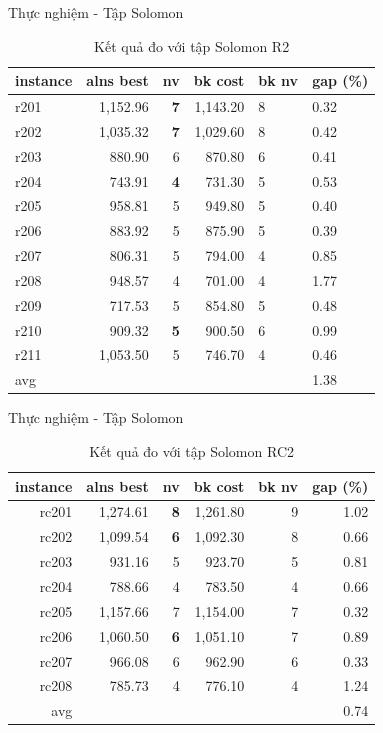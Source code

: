 \begin{frame}{Thực nghiệm - Tập Solomon}
  \begin{table}
    \small
    \centering
    \begin{tabular}{lrrrll}
    \hline
    instance & alns best & nv & bk cost & bk nv & gap (\%) \\ \hline
    r201 & 1,152.96 & \textbf{7} & 1,143.20 & 8 & 0.32 \\ \hline
    r202 & 1,035.32 & \textbf{7} & 1,029.60 & 8 & 0.42 \\ \hline
    r203 & 880.90 & 6 & 870.80 & 6 & 0.41 \\ \hline
    r204 & 743.91 & \textbf{4} & 731.30 & 5 & 0.53 \\ \hline
    r205 & 958.81 & 5 & 949.80 & 5 & 0.40 \\ \hline
    r206 & 883.92 & 5 & 875.90 & 5 & 0.39 \\ \hline
    r207 & 806.31 & 5 & 794.00 & 4 & 0.85 \\ \hline
    r208 & 948.57 & 4 & 701.00 & 4 & 1.77 \\ \hline
    r209 & 717.53 & 5 & 854.80 & 5 & 0.48 \\ \hline
    r210 & 909.32 & \textbf{5} & 900.50 & 6 & 0.99 \\ \hline
    r211 & 1,053.50 & 5 & 746.70 & 4 & 0.46 \\ \hline
    avg &  &  &  &  & 1.38 \\ \hline
    \end{tabular}
    \caption{Kết quả đo với tập Solomon R2}
  \end{table}
\end{frame}

\begin{frame}{Thực nghiệm - Tập Solomon}
  \begin{table}[, label=exp:solomonRC2, placement=h]
    \small
    \centering
    \begin{tabular}{rrrrrr}
    \hline
    instance & alns best & nv & bk cost & bk nv & gap (\%) \\ \hline
    rc201 & 1,274.61 & \textbf{8} & 1,261.80 & 9 & 1.02 \\ \hline
    rc202 & 1,099.54 & \textbf{6} & 1,092.30 & 8 & 0.66 \\ \hline
    rc203 & 931.16 & 5 & 923.70 & 5 & 0.81 \\ \hline
    rc204 & 788.66 & 4 & 783.50 & 4 & 0.66 \\ \hline
    rc205 & 1,157.66 & 7 & 1,154.00 & 7 & 0.32 \\ \hline
    rc206 & 1,060.50 & \textbf{6} & 1,051.10 & 7 & 0.89 \\ \hline
    rc207 & 966.08 & 6 & 962.90 & 6 & 0.33 \\ \hline
    rc208 & 785.73 & 4 & 776.10 & 4 & 1.24 \\ \hline
    avg &  &  &  &  & 0.74 \\ \hline
    \end{tabular}
    \caption{Kết quả đo với tập Solomon RC2}
  \end{table}
\end{frame}

